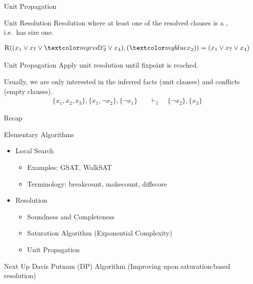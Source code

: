 \documentclass[t]{sdqbeamer}
\begin{document}
\begin{frame}{Unit Propagation}
\begin{block}{Unit Resolution}
Resolution where at least one of the resolved clauses is a , i.e.~has size one.
\end{block}
\begin{example}
\vspace*{-3ex}
\begin{align*}
	\operatorname{R}((x_1 \vee x_7 \vee \highlo{\overline{x_2}} \vee x_4), (\highl{x_2})) = (x_1 \vee x_7 \vee x_4)
\end{align*}
\end{example}
\pause
\begin{block}{Unit Propagation}
Apply unit resolution until fixpoint is reached.
\end{block}
\begin{example}
Usually, we are only interested in the inferred facts (unit clauses) and conflicts (empty clauses).
\vspace*{-1ex}
\begin{align*}
	\{ x_1, x_2, x_3 \}, \{ x_1, \lnot x_2 \}, \{ \lnot x_1 \} \quad &\vdash_1 \quad \{ \lnot x_2 \}, \{ x_3 \}
\end{align*}
\end{example}
\end{frame}

\begin{frame}{Recap}
	\begin{block}{Elementary Algorithms}
		\begin{itemize}\setlength{\itemsep}{1ex}
			\item Local Search
			\begin{itemize}
				\item Examples: GSAT, WalkSAT
				\item Terminology: breakcount, makecount, diffscore
			\end{itemize}
			\item Resolution
			\begin{itemize}
				\item Soundness and Completeness
				\item Saturation Algorithm (Exponential Complexity)
				\item Unit Propagation
			\end{itemize}
		\end{itemize}
	\end{block}
	\pause
	\begin{block}{Next Up}
		Davis Putnam (DP) Algorithm (Improving upon saturation-based resolution)
	\end{block}
\end{frame}
\end{document}
